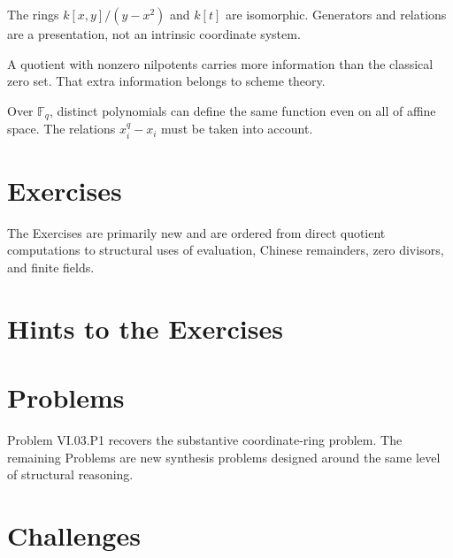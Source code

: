 \begin{warning}
The rings \(k[x,y]/(y-x^2)\) and \(k[t]\) are isomorphic.  Generators and relations are a
presentation, not an intrinsic coordinate system.
\end{warning}

\begin{warning}
A quotient with nonzero nilpotents carries more information than the classical zero set.
That extra information belongs to scheme theory.
\end{warning}

\begin{warning}
Over \(\mathbb F_q\), distinct polynomials can define the same function even on all of
affine space.  The relations \(x_i^q-x_i\) must be taken into account.
\end{warning}



\section{Exercises}
\label{sec:vi03-exercises}
The Exercises are primarily new and are ordered from direct quotient computations to
structural uses of evaluation, Chinese remainders, zero divisors, and finite fields.


\ifdefined\IncludeExerciseHints
\section{Hints to the Exercises}
\label{sec:vi03-exercise-hints}

\fi

\section{Problems}
\label{sec:vi03-problems}
Problem VI.03.P1 recovers the substantive coordinate-ring problem.  The remaining
Problems are new synthesis problems designed around the same level of structural reasoning.


\section{Challenges}
\label{sec:vi03-challenges}


